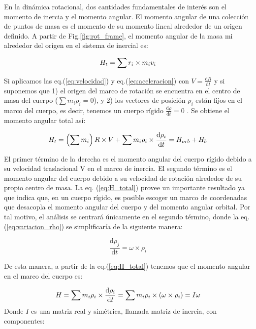 En la dinámica rotacional, dos cantidades fundamentales de interés son el momento de inercia y el momento angular. El momento angular de una colección de puntos de masa es el momento de su momento lineal alrededor de un origen definido. A partir de Fig.\ref{fig:rot_frame}, el momento angular de la masa mi alrededor del origen en el sistema de inercial es:

\begin{equation}
	H_{t}=\sum r_i \times m_i v_i\\
\end{equation}

Si aplicamos las eq.(\ref{eq:velocidad}) y eq.(\ref{eq:aceleracion}) con $V =\frac{\mathrm{d} {R}}{\mathrm{d} t}$ y si suponemos que 1) el origen del marco de rotación se encuentra en el centro de masa del cuerpo ($\sum m_i\rho_i =0$), y 2) los vectores de posición $\rho_i$ están fijos en el marco del cuerpo, es decir, tenemos un cuerpo rígido $\frac{\mathrm{d} {\rho}}{\mathrm{d} t} =0$ . Se obtiene el momento angular total así:

\begin{equation}\label{eq:H_total}
H_{t}=\left(\sum m_i\right)R\times V +\sum m_i \rho_i\times\frac{\mathrm{d} {\rho_i}}{\mathrm{d} t} = H_{orb} + H_b \\
\end{equation}

El primer término de la derecha es el momento angular del cuerpo rígido debido a su velocidad traslacional V en el marco de inercia. El segundo término es el momento angular del cuerpo debido a su velocidad de rotación alrededor de su propio centro de masa. La eq. (\ref{eq:H_total}) provee un importante resultado ya que indica que, en un cuerpo rígido, es posible escoger un marco de coordenadas que desacopla el momento angular del cuerpo y del momento angular orbital.
Por tal motivo, el análisis se centrará únicamente en el segundo término, donde la eq.(\ref{eq:variacion_rho}) se simplificaría de la siguiente manera: 

\begin{equation}\label{eq:variacion_rho_simplificada}
	\frac{\mathrm{d} \rho_j}{\mathrm{d} t}=\omega\times\rho_i
\end{equation}

De esta manera, a partir de la eq.(\ref{eq:H_total}) tenemos que el momento angular en el marco del cuerpo es:

\begin{equation}\label{eq:H_total_simplificada}
	H=\sum m_i\rho_i\times\frac{\mathrm{d} {\rho_i}}{\mathrm{d} t} =
	 \sum m_i\rho_i \times(\omega \times \rho_i) = I\omega \\
\end{equation}
Donde $I$ es una matriz real y simétrica, llamada matriz de inercia, con componentes: 
 
